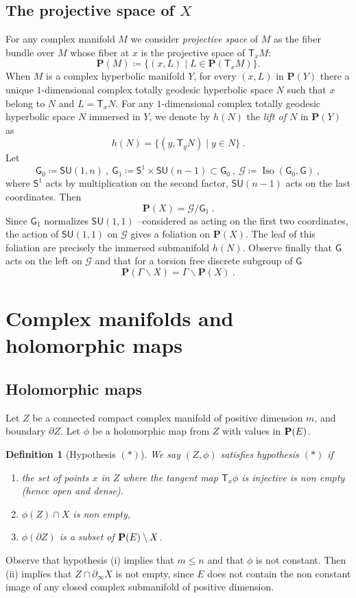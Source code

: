\documentclass[12pt,reqno]{amsart}
\newtheorem{definition}[theorem]{Definition}
\newcommand{\T}{\ms T}
\renewcommand{\leq}{\leqslant}
\newcommand{\mG}{\ms G}
\newcommand{\ms}{\mathsf}
\newcommand{\mc}{\mathcal}
\newcommand{\defeq}{\coloneqq}
\newcommand{\Iso}{\operatorname{Iso}}
\newcommand{\bP}{{\mathbf P}}
\newcommand{\cG}{\mathcal G}
\begin{document}
\subsection{The projective space of $X$} For any complex manifold $M$ we consider
{\em projective space} of $M$ as the fiber bundle  over $M$ whose fiber at $x$ is the projective space of $\T_xM$: 
$$
\bP(M)\defeq\{(x,L)\mid L\in \bP(\T_xM)\}.
$$
When $M$ is a complex hyperbolic manifold $Y$, for every $(x,L)$ in $\bP(Y)$ there a unique $1$-dimensional complex totally geodesic hyperbolic space $N$ such that $x$ belong to $N$ and $L=\T_xN$. For any $1$-dimensional complex totally geodesic hyperbolic space $N$ immersed in $Y$, we denote by $h(N)$ the {\em lift of $N$} in $\bP(Y)$ as 
$$
h(N)=\{(y,\T_y N)\mid y\in N\}\ .
$$ 
Let  
$$\mG_0\defeq\mathsf{SU}(1,n)\ ,  \ \mG_1\defeq\mathsf{S}^1 \times\mathsf{SU}(n-1)\subset \mG_0\ , \ \mc G\defeq\Iso(\mG_0,\mG)\ ,$$ where ${\mathsf S}^1$ acts by 
multiplication on the second factor, $\mathsf{SU}(n-1)$ acts on the last coordinates. Then
$$
\bP(X)=\mc G/\mG_1\  .
$$
Since $\mG_1$ normalizes $\mathsf{SU}(1,1)$ --considered as acting on the first two coordinates, the action of $\mathsf{SU}(1,1)$ on  $\mc G$ gives a foliation on $\bP(X)$. The leaf of this foliation are precisely the immersed submanifold $h(N)$. Observe finally that $\mG$ acts on the left on $\cG$ and that for a torsion free discrete subgroup of $\mG$
$$
{\bP}(\Gamma\backslash X)=\Gamma\backslash\bP(X)\ .
$$
\section{Complex manifolds and holomorphic maps}
\subsection{Holomorphic maps}
Let $Z$ be a connected compact complex manifold of positive dimension $m$,  and boundary $\partial Z$. Let  $\phi$ be a holomorphic map from $Z$ with values in ${\bf P}(E)$.

\begin{definition}[\sc Hypothesis $(*)$]\label{sec:hypo*}
	We say $(Z,\phi)$  {\em satisfies hypothesis $(*)$} if  
\begin{enumerate}
	\item the set of  points $x$ in $Z$  where the tangent map  $\T_x\phi$ is injective is non empty (hence open and dense).	\item $\phi(Z)\cap X$ is non empty,
	\item $\phi(\partial Z)$ is a subset of ${\bf P}(E)\setminus X$.
\end{enumerate} 

\end{definition} 
Observe that  hypothesis (i) implies that   $m\leq n$ and that $\phi$ is not constant.  Then  (ii) implies that $Z\cap \partial_\infty X$ is not empty, since $E$ does not contain the non constant image  of any closed complex submanifold of positive dimension. 
\end{document}
